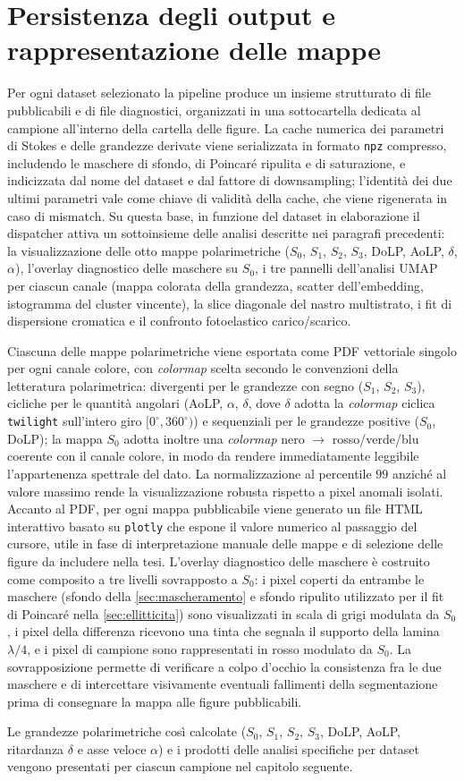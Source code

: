 \section{Persistenza degli output e rappresentazione delle mappe}
\label{sec:rappresentazione_output}

Per ogni dataset selezionato la pipeline produce un insieme strutturato di file pubblicabili e di file diagnostici, organizzati in una sottocartella dedicata al campione all'interno della cartella delle figure. La cache numerica dei parametri di Stokes e delle grandezze derivate viene serializzata in formato \texttt{npz} compresso, includendo le maschere di sfondo, di Poincaré ripulita e di saturazione, e indicizzata dal nome del dataset e dal fattore di downsampling; l'identità dei due ultimi parametri vale come chiave di validità della cache, che viene rigenerata in caso di mismatch. Su questa base, in funzione del dataset in elaborazione il dispatcher attiva un sottoinsieme delle analisi descritte nei paragrafi precedenti: la visualizzazione delle otto mappe polarimetriche ($S_0$, $S_1$, $S_2$, $S_3$, DoLP, AoLP, $\delta$, $\alpha$), l'overlay diagnostico delle maschere su $S_0$, i tre pannelli dell'analisi UMAP per ciascun canale (mappa colorata della grandezza, scatter dell'embedding, istogramma del cluster vincente), la slice diagonale del nastro multistrato, i fit di dispersione cromatica e il confronto fotoelastico carico/scarico.

Ciascuna delle mappe polarimetriche viene esportata come PDF vettoriale singolo per ogni canale colore, con \emph{colormap} scelta secondo le convenzioni della letteratura polarimetrica: divergenti per le grandezze con segno ($S_1$, $S_2$, $S_3$), cicliche per le quantità angolari (AoLP, $\alpha$, $\delta$, dove $\delta$ adotta la \emph{colormap} ciclica \texttt{twilight} sull'intero giro $[0^\circ, 360^\circ)$) e sequenziali per le grandezze positive ($S_0$, DoLP); la mappa $S_0$ adotta inoltre una \emph{colormap} nero $\to$ rosso/verde/blu coerente con il canale colore, in modo da rendere immediatamente leggibile l'appartenenza spettrale del dato. La normalizzazione al percentile $99$ anziché al valore massimo rende la visualizzazione robusta rispetto a pixel anomali isolati. Accanto al PDF, per ogni mappa pubblicabile viene generato un file HTML interattivo basato su \texttt{plotly} che espone il valore numerico al passaggio del cursore, utile in fase di interpretazione manuale delle mappe e di selezione delle figure da includere nella tesi. L'overlay diagnostico delle maschere è costruito come composito a tre livelli sovrapposto a $S_0$: i pixel coperti da entrambe le maschere (sfondo della \cref{sec:mascheramento} e sfondo ripulito utilizzato per il fit di Poincaré nella \cref{sec:ellitticita}) sono visualizzati in scala di grigi modulata da $S_0$, i pixel della differenza ricevono una tinta che segnala il supporto della lamina $\lambda/4$, e i pixel di campione sono rappresentati in rosso modulato da $S_0$. La sovrapposizione permette di verificare a colpo d'occhio la consistenza fra le due maschere e di intercettare visivamente eventuali fallimenti della segmentazione prima di consegnare la mappa alle figure pubblicabili.

Le grandezze polarimetriche così calcolate ($S_0$, $S_1$, $S_2$, $S_3$, DoLP, AoLP, ritardanza $\delta$ e asse veloce $\alpha$) e i prodotti delle analisi specifiche per dataset vengono presentati per ciascun campione nel capitolo seguente.
